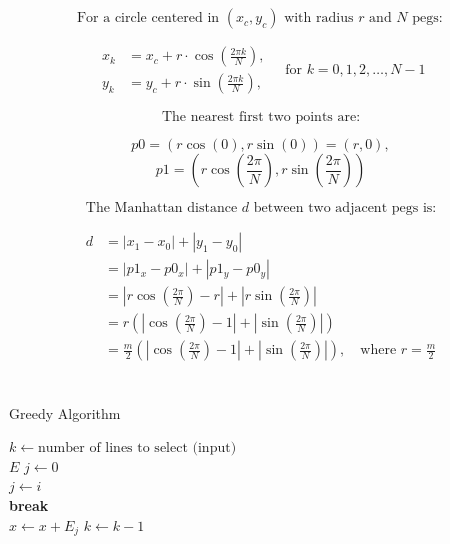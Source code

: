 \chapter{}
\label{app:d}

\[
\text{For a circle centered in } (x_c, y_c) \text{ with radius } r \text{ and } N \text{ pegs}:
\]

\[
\begin{aligned}
x_k &= x_c + r \cdot \cos\left( \frac{2\pi k}{N} \right), \\
y_k &= y_c + r \cdot \sin\left( \frac{2\pi k}{N} \right),
\end{aligned}
\quad \text{for } k = 0, 1, 2, \dots, N - 1
\]

\[
\text{The nearest first two points are:}
\]

\[
p0 = (r\cos(0), r\sin(0)) = (r, 0),
\]
\[
p1 = (r\cos(\frac{2\pi}{N}), r\sin(\frac{2\pi}{N}))
\]

\[\text{The Manhattan distance } d \text{ between two adjacent pegs is:}\]

\[
\begin{aligned}
d &= \left| x_1 - x_0 \right| + \left| y_1 - y_0 \right| \\
  &= \left| p1_x - p0_x \right| + \left| p1_y - p0_y \right| \\
  &= \left| r\cos\left(\frac{2\pi}{N}\right) - r \right| + \left| r\sin\left(\frac{2\pi}{N}\right) \right| \\
  &= r\left( \left| \cos\left(\frac{2\pi}{N}\right) - 1 \right| + \left| \sin\left(\frac{2\pi}{N}\right) \right| \right) \\
  &= \frac{m}{2} \left( \left| \cos\left(\frac{2\pi}{N}\right) - 1 \right| + \left| \sin\left(\frac{2\pi}{N}\right) \right| \right), \quad \text{where } r = \frac{m}{2}
\end{aligned}
\]

\chapter{}
\label{app:greedy}

\begin{algorithm}
\caption{Greedy Algorithm}
\begin{algorithmic}[1]
\State $k \gets \text{number of lines to select (input)}$ \\

    \State $E$ 
    \State $j \gets 0$  \\
            \State $j \gets i$
        \EndIf
    \EndFor \\

        \State \textbf{break}
    \EndIf \\

    \State $x \gets x + E_j$
    \State $k \gets k - 1$
\EndWhile
\end{algorithmic}
\end{algorithm}

